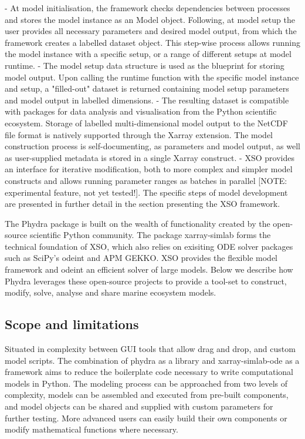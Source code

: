 \documentclass[journal abbreviation, manuscript]{copernicus}
\begin{document}
- At model initialisation, the framework checks dependencies between processes and stores the model instance as an Model object. Following, at model setup the user provides all necessary parameters and desired model output, from which the framework creates a labelled dataset object. This step-wise process allows running the model instance with a specific setup, or a range of different setups at model runtime. 
- The model setup data structure is used as the blueprint for storing model output. Upon calling the runtime function with the specific model instance and setup, a "filled-out" dataset is returned containing model setup parameters and model output in labelled dimensions. 
- The resulting dataset is compatible with packages for data analysis and visualisation from the Python scientific ecosystem. Storage of labelled multi-dimensional model output to the NetCDF file format is natively supported through the Xarray extension.
The model construction process is self-documenting, as parameters and model output, as well as user-supplied metadata is stored in a single Xarray construct.
- XSO provides an interface for iterative modification, both to more complex and simpler model constructs and allows running parameter ranges as batches in parallel [NOTE: experimental feature, not yet tested!]. The specific steps of model development are presented in further detail in the section presenting the XSO framework.

The Phydra package is built on the wealth of functionality created by the open-source scientific Python community. The package xarray-simlab forms the technical foundation of XSO, which also relies on exisiting ODE solver packages such as SciPy's odeint and APM GEKKO. XSO provides the flexible model framework and odeint an efficient solver of large models. 
Below we describe how Phydra leverages these open-source projects to provide a tool-set to construct, modify, solve, analyse and share marine ecosystem models. 

\subsection{Scope and limitations}

Situated in complexity between GUI tools that allow drag and drop, and custom model scripts. The combination of phydra as a library and xarray-simlab-ode as a framework aims to reduce the boilerplate code necessary to write computational models in Python.
The modeling process can be approached from two levels of complexity, models can be assembled and executed from pre-built components, and model objects can be shared and supplied with custom parameters for further testing. More advanced users can easily build their own components or modify mathematical functions where necessary.
\end{document}
